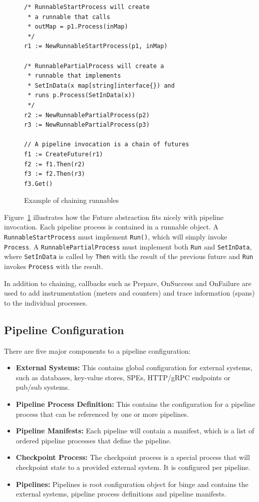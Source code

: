 \documentclass[10pt,twocolumn]{article}
\def\code#1{\texttt{#1}}
\begin{document}
\begin{figure}
\begin{lstlisting}[linewidth=\columnwidth,breaklines=true]
/* RunnableStartProcess will create 
 * a runnable that calls 
 * outMap = p1.Process(inMap)
 */
r1 := NewRunnableStartProcess(p1, inMap)

/* RunnablePartialProcess will create a 
 * runnable that implements 
 * SetInData(x map[string]interface{}) and 
 * runs p.Process(SetInData(x))
 */
r2 := NewRunnablePartialProcess(p2)
r3 := NewRunnablePartialProcess(p3)

// A pipeline invocation is a chain of futures
f1 := CreateFuture(r1)
f2 := f1.Then(r2)
f3 := f2.Then(r3)
f3.Get()
\end{lstlisting}
\caption{Example of chaining runnables}
\label{fig:runnables}
\end{figure}

Figure~\ref{fig:runnables} illustrates how the Future abstraction fits nicely
with pipeline invocation.  Each pipeline process is contained in a runnable
object.  A \code{RunnableStartProcess} must implement \code{Run()}, which will simply
invoke \code{Process}.  A \code{RunnablePartialProcess} must implement both \code{Run} and
\code{SetInData}, where \code{SetInData} is called by \code{Then} with the result of the
previous future and \code{Run} invokes \code{Process} with the result.

In addition to chaining, callbacks such as Prepare, OnSuccess and OnFailure are
used to add instrumentation (meters and counters) and trace information (spans)
to the individual processes.

\subsection{Pipeline Configuration}

There are five major components to a pipeline configuration:

\begin{itemize}
\item[]{{\bfseries External Systems:}} This contains global configuration for external systems, such as databases, key-value stores, SPEs, HTTP/gRPC endpoints or pub/sub systems.
\item[]{{\bfseries Pipeline Process Definition:}} This contains the configuration for a pipeline process that can be referenced by one or more pipelines.
\item[]{{\bfseries Pipeline Manifests:}} Each pipeline will contain a manifest, which is a list of ordered pipeline processes that define the pipeline.
\item[]{{\bfseries Checkpoint Process:}} The checkpoint process is a special process that will checkpoint state to a provided external system.  It is configured per pipeline.
\item[]{{\bfseries Pipelines:}} Pipelines is root configuration object for binge and contains the external systems, pipeline process definitions and pipeline manifests.
\end{itemize}
\end{document}
